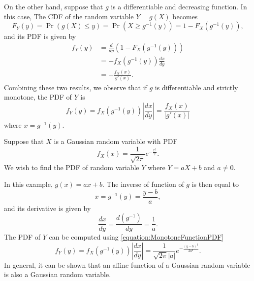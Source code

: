 On the other hand, suppose that $g$ is a differentiable and decreasing function.
In this case, The CDF of the random variable $Y = g(X)$ becomes
\begin{equation*}
F_Y(y) = \Pr (g(X) \leq y)
= \Pr \left( X \geq g^{-1}(y) \right)
= 1 - F_X \left( g^{-1} (y) \right) ,
\end{equation*}
and its PDF is given by
\begin{equation*}
\begin{split}
f_Y (y) &= \frac{d}{dy} \left( 1 - F_X \left( g^{-1} (y) \right) \right) \\
&= - f_X \left( g^{-1} (y) \right) \frac{dx}{dy} \\
&= - \frac{f_X (x)}{g'(x)} .
\end{split}
\end{equation*}
Combining these two results, we observe that if $g$ is differentiable and strictly monotone, the PDF of $Y$ is
\begin{equation} \label{equation:MonotoneFunctionPDF}
f_Y (y) = f_X \left( g^{-1} (y) \right) \left| \frac{dx}{dy} \right|
= \frac{f_X (x)}{\left| g'(x) \right|}
\end{equation}
where $x = g^{-1}(y)$.

\begin{example}
Suppose that $X$ is a Gaussian random variable with PDF
\begin{equation*}
f_X(x) = \frac{1}{\sqrt{2 \pi}} e^{- \frac{x^2}{2}} .
\end{equation*}
We wish to find the PDF of random variable $Y$ where $Y = a X + b$ and $a \neq 0$.

In this example, $g(x) = ax + b$.
The inverse of function of $g$ is then equal to
\begin{equation*}
x = g^{-1} (y) = \frac{y - b}{a} ,
\end{equation*}
and its derivative is given by
\begin{equation*}
\frac{dx}{dy} = \frac{d (g^{-1})}{dy} = \frac{1}{a} .
\end{equation*}
The PDF of $Y$ can be computed using \eqref{equation:MonotoneFunctionPDF}
\begin{equation*}
f_Y(y) = f_X \left( g^{-1} (y) \right) \left| \frac{dx}{dy} \right|
= \frac{1}{\sqrt{2 \pi} |a|} e^{- \frac{(y-b)^2}{2 a^2} }.
\end{equation*}
In general, it can be shown that an affine function of a Gaussian random variable is also a Gaussian random variable.
\end{example}

